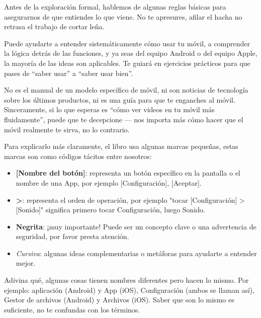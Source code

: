 
Antes de la exploración formal, hablemos de algunas reglas básicas para asegurarnos de que entiendes lo que viene. No te apresures, afilar el hacha no retrasa el trabajo de cortar leña.


Puede ayudarte a entender sistemáticamente cómo usar tu móvil, a comprender la lógica detrás de las funciones, y ya seas del equipo Android o del equipo Apple, la mayoría de las ideas son aplicables. Te guiará en ejercicios prácticos para que pases de “saber usar” a “saber usar bien”.

No es el manual de un modelo específico de móvil, ni son noticias de tecnología sobre los últimos productos, ni es una guía para que te enganches al móvil. Sinceramente, si lo que esperas es “cómo ver videos en tu móvil más fluidamente”, puede que te decepcione — nos importa más cómo hacer que el móvil realmente te sirva, no lo contrario.


Para explicarlo más claramente, el libro usa algunas marcas pequeñas, estas marcas son como códigos tácitos entre nosotros:

\begin{itemize}
  \item \textbf{[Nombre del botón]}: representa un botón específico en la pantalla o el nombre de una App, por ejemplo [Configuración], [Aceptar].
  \item \textbf{>}: representa el orden de operación, por ejemplo "tocar [Configuración] > [Sonido]" significa primero tocar Configuración, luego Sonido.
  \item \textbf{Negrita}: ¡muy importante! Puede ser un concepto clave o una advertencia de seguridad, por favor presta atención.
  \item \emph{Cursiva}: algunas ideas complementarias o metáforas para ayudarte a entender mejor.
\end{itemize}


Adivina qué, algunas cosas tienen nombres diferentes pero hacen lo mismo. Por ejemplo: aplicación (Android) y App (iOS), Configuración (ambos se llaman así), Gestor de archivos (Android) y Archivos (iOS). Saber que son lo mismo es suficiente, no te confundas con los términos.

